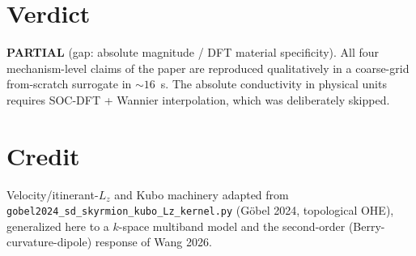 \documentclass[aps,prl,twocolumn,superscriptaddress,floatfix]{revtex4-2}
\begin{document}
\section{Verdict}
\textbf{PARTIAL} (gap: absolute magnitude / DFT material specificity). All four
mechanism-level claims of the paper are reproduced qualitatively in a coarse-grid
from-scratch surrogate in $\sim16$~s. The absolute conductivity in physical units
requires SOC-DFT + Wannier interpolation, which was deliberately skipped.

\section*{Credit}
Velocity/itinerant-$L_z$ and Kubo machinery adapted from
\texttt{gobel2024\_sd\_skyrmion\_kubo\_Lz\_kernel.py} (G\"obel 2024, topological
OHE), generalized here to a $k$-space multiband model and the second-order
(Berry-curvature-dipole) response of Wang 2026.
\end{document}
